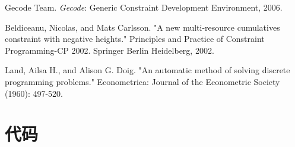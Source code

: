 \documentclass[UTF8]{ctexart}
\begin{document}
\begin{thebibliography}{1}  %
 Gecode Team.  \textit{Gecode}: Generic Constraint
  Development Environment, 2006. 
  
Beldiceanu, Nicolas, and Mats Carlsson. "A new multi-resource cumulatives constraint with negative heights." Principles and Practice of Constraint Programming-CP 2002. Springer Berlin Heidelberg, 2002. 

 Land, Ailsa H., and Alison G. Doig. "An automatic method of solving discrete programming problems." Econometrica: Journal of the Econometric Society (1960): 497-520.


\end{thebibliography}

\appendix
\section{代码}
\end{document}
